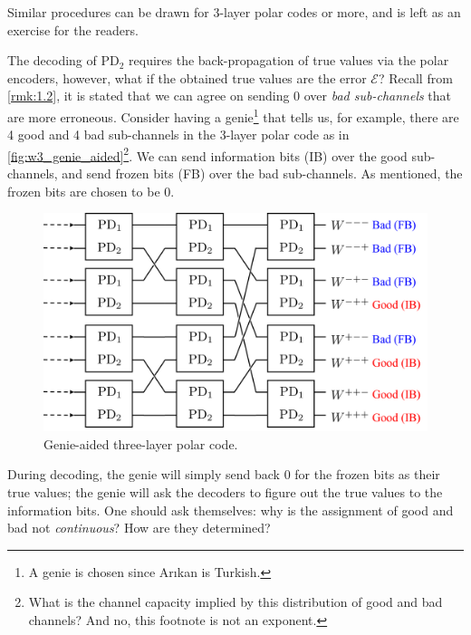 Similar procedures can be drawn for 3-layer polar codes or more, and is left as an exercise for the readers.

The decoding of $\mathrm{PD}_2$ requires the back-propagation of true values via the polar encoders, however, what if the obtained true values are the error $\mathcal{E}$? Recall from \autoref{rmk:1.2}, it is stated that we can agree on sending $0$ over \textit{bad sub-channels} that are more erroneous. Consider having a genie\footnote{A genie is chosen since Ar{\i}kan is Turkish.} that tells us, for example, there are 4 good and 4 bad sub-channels in the 3-layer polar code as in \autoref{fig:w3_genie_aided}\footnote{What is the channel capacity implied by this distribution of good and bad channels? And no, this footnote is not an exponent.}. We can send information bits (IB) over the good sub-channels, and send frozen bits (FB) over the bad sub-channels. As mentioned, the frozen bits are chosen to be 0.

\begin{figure}[h]
    \centering
    \includegraphics[width=0.6\linewidth]{figures/w3_genie.png}
    \caption{Genie-aided three-layer polar code.}
    \label{fig:w3_genie_aided}
\end{figure}

During decoding, the genie will simply send back 0 for the frozen bits as their true values; the genie will ask the decoders to figure out the true values to the information bits. One should ask themselves: why is the assignment of good and bad not \textit{continuous}? How are they determined?


